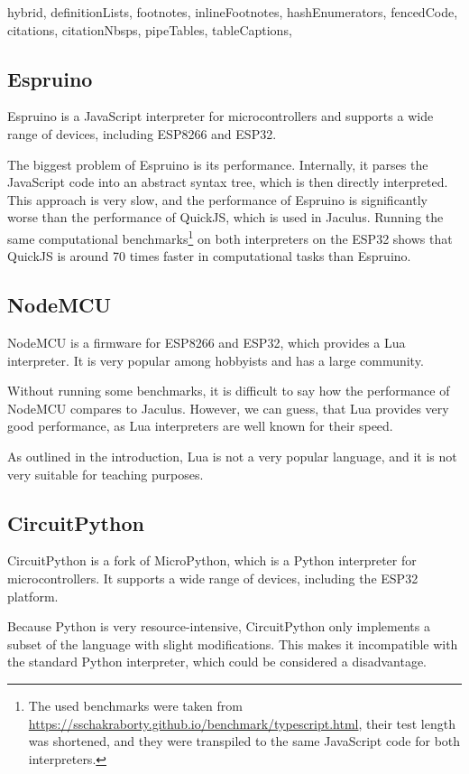 \begin{markdown*}{%
  hybrid,
  definitionLists,
  footnotes,
  inlineFootnotes,
  hashEnumerators,
  fencedCode,
  citations,
  citationNbsps,
  pipeTables,
  tableCaptions,
}
\subsection{Espruino}

Espruino is a JavaScript interpreter for microcontrollers and supports a wide range of devices, including ESP8266 and ESP32.

The biggest problem of Espruino is its performance. Internally, it parses the JavaScript code into an abstract syntax tree, which is then directly interpreted. This approach is very slow, and the performance of Espruino is significantly worse than the performance of QuickJS, which is used in Jaculus. Running the same computational benchmarks\footnote{The used benchmarks were taken from \url{https://sschakraborty.github.io/benchmark/typescript.html}, their test length was shortened, and they were transpiled to the same JavaScript code for both interpreters.} on both interpreters on the ESP32 shows that QuickJS is around 70 times faster in computational tasks than Espruino.

\subsection{NodeMCU}

NodeMCU is a firmware for ESP8266 and ESP32, which provides a Lua interpreter. It is very popular among hobbyists and has a large community.

Without running some benchmarks, it is difficult to say how the performance of NodeMCU compares to Jaculus. However, we can guess, that Lua provides very good performance, as Lua interpreters are well known for their speed.

As outlined in the introduction, Lua is not a very popular language, and it is not very suitable for teaching purposes.

\subsection{CircuitPython}

CircuitPython is a fork of MicroPython, which is a Python interpreter for microcontrollers. It supports a wide range of devices, including the ESP32 platform.

Because Python is very resource-intensive, CircuitPython only implements a subset of the language with slight modifications. This makes it incompatible with the standard Python interpreter, which could be considered a disadvantage.



\end{markdown*}
